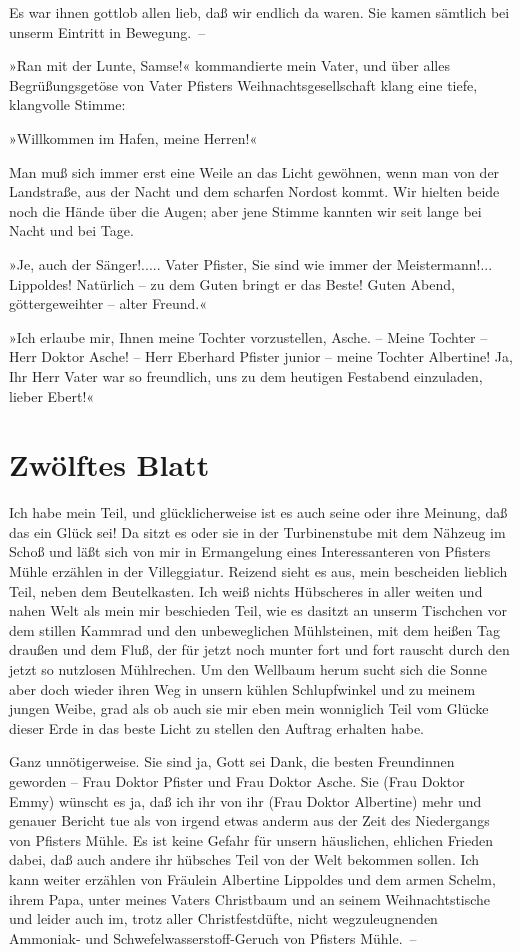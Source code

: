 Es war ihnen gottlob allen lieb, daß wir endlich da waren. Sie
kamen sämtlich bei unserm Eintritt in Bewegung.~–

»Ran mit der Lunte, Samse!« kommandierte mein Vater, und über alles
Begrüßungsgetöse von Vater Pfisters Weihnachtsgesellschaft klang
eine tiefe, klangvolle Stimme:

»Willkommen im Hafen, meine Herren!«

Man muß sich immer erst eine Weile an das Licht gewöhnen, wenn man
von der Landstraße, aus der Nacht und dem scharfen Nordost kommt.
Wir hielten beide noch die Hände über die Augen; aber jene Stimme
kannten wir seit lange bei Nacht und bei Tage.

»Je, auch der Sänger!..... Vater Pfister, Sie sind wie immer der
Meistermann!... Lippoldes! Natürlich – zu dem Guten bringt er das
Beste! Guten Abend, göttergeweihter – alter Freund.«

»Ich erlaube mir, Ihnen meine Tochter vorzustellen, Asche. – Meine
Tochter – Herr Doktor Asche! – Herr Eberhard Pfister junior – meine
Tochter Albertine! Ja, Ihr Herr Vater war so freundlich, uns zu dem
heutigen Festabend einzuladen, lieber Ebert!«

\section{Zwölftes Blatt}

Ich habe mein Teil, und glücklicherweise ist es auch seine oder
ihre Meinung, daß das ein Glück sei! Da sitzt es oder sie in der
Turbinenstube mit dem Nähzeug im Schoß und läßt sich von mir in
Ermangelung eines Interessanteren von Pfisters Mühle erzählen in
der Villeggiatur. Reizend sieht es aus, mein bescheiden lieblich
Teil, neben dem Beutelkasten. Ich weiß nichts Hübscheres in aller
weiten und nahen Welt als mein mir beschieden Teil, wie es dasitzt
an unserm Tischchen vor dem stillen Kammrad und den unbeweglichen
Mühlsteinen, mit dem heißen Tag draußen und dem Fluß, der für jetzt
noch munter fort und fort rauscht durch den jetzt so nutzlosen
Mühlrechen. Um den Wellbaum herum sucht sich die Sonne aber doch
wieder ihren Weg in unsern kühlen Schlupfwinkel und zu meinem
jungen Weibe, grad als ob auch sie mir eben mein wonniglich Teil
vom Glücke dieser Erde in das beste Licht zu stellen den Auftrag
erhalten habe.

Ganz unnötigerweise. Sie sind ja, Gott sei Dank, die besten
Freundinnen geworden – Frau Doktor Pfister und Frau Doktor Asche.
Sie (Frau Doktor Emmy) wünscht es ja, daß ich ihr von ihr (Frau
Doktor Albertine) mehr und genauer Bericht tue als von irgend etwas
anderm aus der Zeit des Niedergangs von Pfisters Mühle. Es ist
keine Gefahr für unsern häuslichen, ehlichen Frieden dabei, daß
auch andere ihr hübsches Teil von der Welt bekommen sollen. Ich
kann weiter erzählen von Fräulein Albertine Lippoldes und dem armen
Schelm, ihrem Papa, unter meines Vaters Christbaum und an seinem
Weihnachtstische und leider auch im, trotz aller Christfestdüfte,
nicht wegzuleugnenden Ammoniak- und Schwefelwasserstoff-Geruch von
Pfisters Mühle.~–

